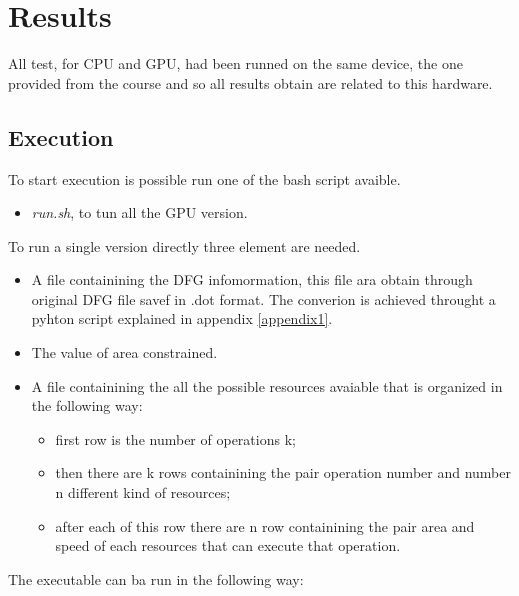 \chapter{Results}
\label{chap4}

All test, for CPU and GPU, had been runned on the same device, the one provided from the course and so all 
results obtain are related to this hardware.

\section{Execution}

To start execution is possible run one of the bash script avaible.

\begin{itemize}
    \item \emph{run.sh}, to tun all the GPU version.
\end{itemize}

To run a single version directly three element are needed.

\begin{itemize}
    \item A file containining the DFG infomormation, this file ara obtain through original DFG file savef in .dot format. The converion is achieved throught a pyhton script explained in appendix \ref{appendix1}.
    \item The value of area constrained.
    \item A file containining the all the possible resources avaiable that is organized in the following way:
    \begin{itemize}
        \item first row is the number of operations k;
        \item then there are k rows containining the pair operation number and number n different kind of resources;
        \item after each of this row there are n row containining the pair area and speed of each resources that can execute that operation.
    \end{itemize}
\end{itemize}

The executable can ba run in the following way:

